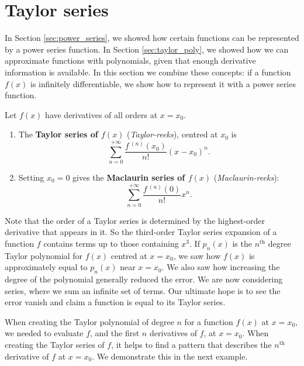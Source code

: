 \section{Taylor series}\label{sec:taylor_series}

In Section \ref{sec:power_series}, we showed how certain functions can be represented by a power series function. In Section \ref{sec:taylor_poly}, we showed how we can approximate functions with polynomials, given that enough derivative information is available. In this section we combine these concepts: if a function $f(x)$ is infinitely differentiable, we show how to represent it with a power series function.

\begin{definition}\label{def:taylor_series}
Let $f(x)$ have derivatives of all orders at $x=x_0$.
\begin{enumerate}
	\item The \textbf{Taylor series of $f(x)$} (\textit{Taylor-reeks}), centred at $x_0$ is
	$$\sum_{n=0}^{+\infty} \frac{f\,^{(n)}(x_0)}{n!}(x-x_0)^n.$$
	\item	Setting $x_0=0$ gives the \textbf{Maclaurin series of $f(x)$} (\textit{Maclaurin-reeks}):
	$$\sum_{n=0}^{+\infty} \frac{f\,^{(n)}(0)}{n!}x^n.$$
\end{enumerate}
\end{definition}

Note that the order of a Taylor series is determined by the highest-order derivative that appears in it. So the third-order Taylor series expansion of a function $f$ contains terms up to those containing $x^3$.  If $p_n(x)$ is the $n^\text{th}$ degree Taylor polynomial for $f(x)$ centred at $x=x_0$, we saw how $f(x)$ is approximately equal to $p_n(x)$ near $x=x_0$. We also saw how increasing the degree of the polynomial generally reduced the error. We are now considering series, where we sum an infinite set of terms. Our ultimate hope is to see the error vanish and claim a function is equal to its Taylor series.


When creating the Taylor polynomial of degree $n$ for a function $f(x)$ at $x=x_0$, we needed to evaluate $f$, and the first $n$ derivatives of $f$, at $x=x_0$. When creating the Taylor series of $f$, it helps to find a pattern that describes the $n^\text{th}$ derivative of $f$ at $x=x_0$. We demonstrate this in the next example.

